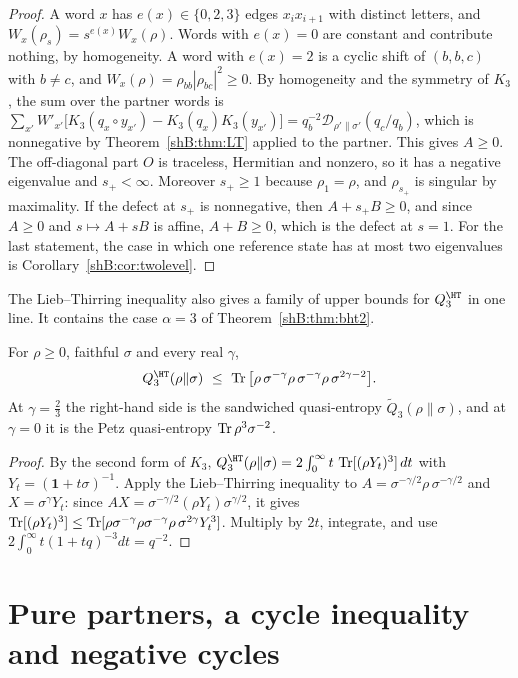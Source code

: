 \begin{proof}
A word $x$ has $e(x)\in\{0,2,3\}$ edges $x_ix_{i+1}$ with distinct letters, and $W_x(\rho_s)=s^{e(x)}W_x(\rho)$. Words with $e(x)=0$ are constant and contribute nothing, by homogeneity. A word with $e(x)=2$ is a cyclic shift of $(b,b,c)$ with $b\ne c$, and $W_x(\rho)=\rho_{bb}|\rho_{bc}|^2\ge0$. By homogeneity and the symmetry of $K_3$, the sum over the partner words is $\sum_{x'}W'_{x'}\big[K_3(q_x\circ y_{x'})-K_3(q_x)K_3(y_{x'})\big]=q_b^{-2}\mathcal D_{\rho'\|\sigma'}(q_c/q_b)$, which is nonnegative by Theorem~\ref{shB:thm:LT} applied to the partner. This gives $A\ge0$. The off-diagonal part $O$ is traceless, Hermitian and nonzero, so it has a negative eigenvalue and $s_+<\infty$. Moreover $s_+\ge1$ because $\rho_1=\rho$, and $\rho_{s_+}$ is singular by maximality. If the defect at $s_+$ is nonnegative, then $A+s_+B\ge0$, and since $A\ge0$ and $s\mapsto A+sB$ is affine, $A+B\ge0$, which is the defect at $s=1$. For the last statement, the case in which one reference state has at most two eigenvalues is Corollary~\ref{shB:cor:twolevel}.
\end{proof}

The Lieb--Thirring inequality also gives a family of upper bounds for $Q^\HT_3$ in one line. It contains the case $\alpha=3$ of Theorem~\ref{shB:thm:bht2}.

\begin{corollary}\label{shB:cor:gamma}
For $\rho\ge0$, faithful $\sigma$ and every real $\gamma$,
\[
Q^\HT_3(\rho\|\sigma)\ \le\ \Tr\big[\rho\,\sigma^{-\gamma}\rho\,\sigma^{-\gamma}\rho\,\sigma^{2\gamma-2}\big].
\]
At $\gamma=\frac23$ the right-hand side is the sandwiched quasi-entropy $\widetilde Q_3(\rho\|\sigma)$, and at $\gamma=0$ it is the Petz quasi-entropy $\operatorname{Tr}\rho^3\sigma^{-2}$.
\end{corollary}

\begin{proof}
By the second form of $K_3$, $Q^\HT_3(\rho\|\sigma)=2\int_0^\infty t\,\Tr[(\rho Y_t)^3]\,dt$ with $Y_t=(\mathbf 1+t\sigma)^{-1}$. Apply the Lieb--Thirring inequality to $A=\sigma^{-\gamma/2}\rho\,\sigma^{-\gamma/2}$ and $X=\sigma^\gamma Y_t$: since $AX=\sigma^{-\gamma/2}(\rho Y_t)\sigma^{\gamma/2}$, it gives $\operatorname{Tr}[(\rho Y_t)^3]\le\operatorname{Tr}[\rho\sigma^{-\gamma}\rho\sigma^{-\gamma}\rho\,\sigma^{2\gamma}Y_t^3]$. Multiply by $2t$, integrate, and use $2\int_0^\infty t(1+tq)^{-3}dt=q^{-2}$.
\end{proof}

\section{Pure partners, a cycle inequality and negative cycles}\label{shB:sec:purecycle}

